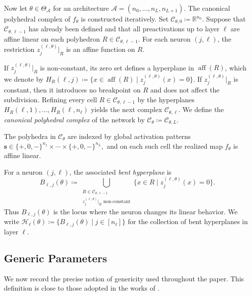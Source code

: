 \documentclass{article}
\theoremstyle{definition}
\newcommand{\aff}{\operatorname{aff}}
\newcommand{\R}{\mathbb{R}}
\newcommand{\architecture}{\mathcal{A}}
\newcommand{\paramspace}[1]{\Theta_{#1}}
\newcommand{\complex}{\mathcal{C}}
\newcommand{\preactivation}[1]{z^{(#1)}}
\newcommand{\bhyperplane}[1]{B_{#1}}
\newcommand{\hyperplanes}[2]{\mathcal{H}_{#1}(#2)}
\begin{document}
Now let $\theta\in\paramspace{\architecture}$ for an architecture
$
\architecture=(n_0,\dots,n_L,n_{L+1}).
$
The canonical polyhedral complex of $f_\theta$ is constructed iteratively.
Set
$
\complex_{\theta,0}\coloneqq \R^{n_0}.
$
Suppose that $\complex_{\theta,\ell-1}$ has already been defined and that all preactivations up to
layer $\ell$ are affine linear on each polyhedron $R\in\complex_{\theta,\ell-1}$.
For each neuron $(j,\ell)$, the restriction $\preactivation{\ell,\theta}_j|_R$ is an affine function on $R$.

If $\preactivation{\ell,\theta}_j|_R$ is non-constant, its zero set defines a hyperplane in
$\aff(R)$, which we denote by
$
H_R(\ell,j)
\coloneqq
\{x\in \aff(R)\mid \preactivation{\ell,\theta}_j(x)=0\}.
$
If $\preactivation{\ell,\theta}_j|_R$ is constant, then it introduces no breakpoint on $R$ and does
not affect the subdivision.
Refining every cell $R\in\complex_{\theta,\ell-1}$ by the hyperplanes
$H_R(\ell,1),\dots,H_R(\ell,n_\ell)$ yields the next complex $\complex_{\theta,\ell}$.
We define the \emph{canonical polyhedral complex} of the network by
$
\complex_\theta \coloneqq \complex_{\theta,L}.
$

The polyhedra in $\complex_\theta$ are indexed by global activation patterns
$
\mathbf{s}\in \{+,0,-\}^{n_1}\times \cdots \times \{+,0,-\}^{n_L},
$
and on each such cell the realized map $f_\theta$ is affine linear.

For a neuron $(j,\ell)$, the associated \emph{bent hyperplane} is
\[
\bhyperplane{\ell,j}(\theta)
\coloneqq
\bigcup_{\substack{R\in\complex_{\theta,\ell-1}\\ \preactivation{\ell,\theta}_j|_R \text{ non-constant}}}
\{x\in R \mid \preactivation{\ell,\theta}_j(x)=0\}.
\]
Thus $\bhyperplane{\ell,j}(\theta)$ is the locus where the neuron changes its linear behavior.
We write
$
\hyperplanes{\ell}{\theta}
\coloneqq
\{\bhyperplane{\ell,j}(\theta)\mid j\in[n_\ell]\}
$
for the collection of bent hyperplanes in layer $\ell$.


\subsection{Generic Parameters} 
\label{app:generic-parameters}

We now record the precise notion of genericity used throughout the paper. This definition is close to those adopted in the works of \citet{phuong2020functional,grillo2026relunetworksadmitidentifiable,marissa}. 
\end{document}
